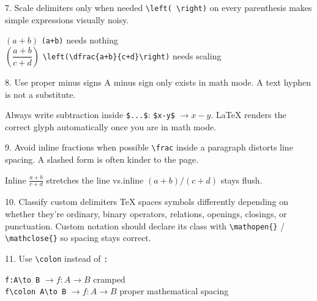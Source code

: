 \documentclass[11pt]{article}
\begin{document}
\begin{tipbox}{7. Scale delimiters only when needed}
\texttt{\textbackslash left( \textbackslash right)} on every parenthesis
makes simple expressions visually noisy.
\end{tipbox}

\begin{center}
$(a+b)$ \quad\texttt{(a+b)} \hfill needs nothing\\[4pt]
$\left(\dfrac{a+b}{c+d}\right)$ \quad\texttt{\textbackslash left(\textbackslash dfrac\{a+b\}\{c+d\}\textbackslash right)} \hfill needs scaling
\end{center}

\begin{tipbox}{8. Use proper minus signs}
A minus sign only exists in math mode. A text hyphen is not a substitute.
\end{tipbox}
\begin{goodcode}
Always write subtraction inside \verb|$...$|: \texttt{\$x-y\$} $\to x-y$. LaTeX
renders the correct glyph automatically once you are in math mode.
\end{goodcode}

\begin{tipbox}{9. Avoid inline fractions when possible}
\texttt{\textbackslash frac} inside a paragraph distorts line spacing.
A slashed form is often kinder to the page.
\end{tipbox}
\begin{center}
Inline $\frac{a+b}{c+d}$ stretches the line \quad vs.\quad inline $(a+b)/(c+d)$ stays flush.
\end{center}

\begin{tipbox}{10. Classify custom delimiters}
TeX spaces symbols differently depending on whether they're ordinary,
binary operators, relations, openings, closings, or punctuation. Custom
notation should declare its class with \texttt{\textbackslash mathopen\{\}}
/ \texttt{\textbackslash mathclose\{\}} so spacing stays correct.
\end{tipbox}

\begin{tipbox}{11. Use \texttt{\textbackslash colon} instead of \texttt{:}}
\end{tipbox}
\begin{center}
\texttt{f:A\textbackslash to B} $\to f:A\to B$ \hfill cramped\\[2pt]
\texttt{f\textbackslash colon A\textbackslash to B} $\to f\colon A\to B$ \hfill proper mathematical spacing
\end{center}
\end{document}
